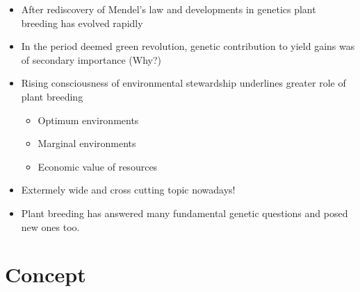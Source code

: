 \documentclass[11pt,ignorenonframetext,aspectratio=169]{beamer}
\providecommand{\tightlist}{%
  \setlength{\itemsep}{0pt}\setlength{\parskip}{0pt}}
\begin{document}
\begin{frame}{}
\protect\hypertarget{section-3}{}
\begin{itemize}
\tightlist
\item
  After rediscovery of Mendel's law and developments in genetics plant
  breeding has evolved rapidly
\item
  In the period deemed green revolution, genetic contribution to yield
  gains was of secondary importance (Why?)
\item
  Rising consciousness of environmental stewardship underlines greater
  role of plant breeding

  \begin{itemize}
  \tightlist
  \item
    Optimum environments
  \item
    Marginal environments
  \item
    Economic value of resources
  \end{itemize}
\item
  Extermely wide and cross cutting topic nowadays!
\item
  Plant breeding has answered many fundamental genetic questions and
  posed new ones too.
\end{itemize}
\end{frame}

\hypertarget{concept}{%
\section{Concept}\label{concept}}
\end{document}
